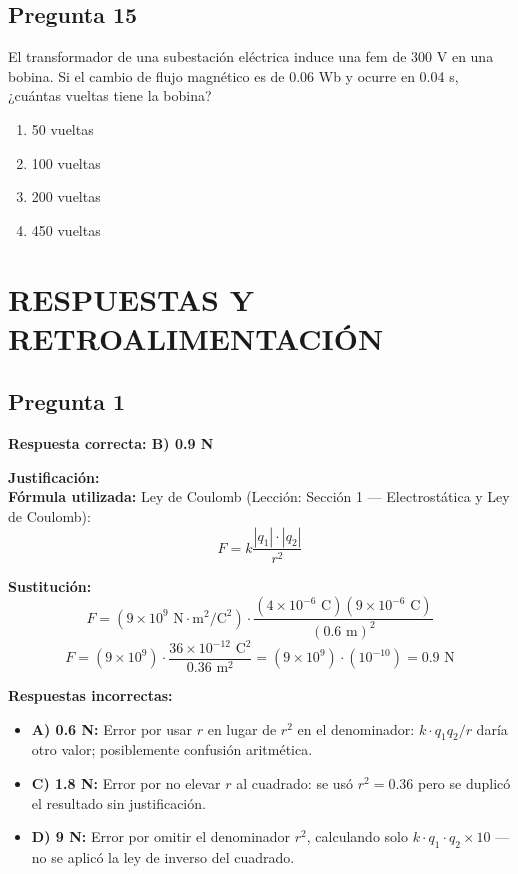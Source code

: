 \begin{preguntabox}
\subsection{Pregunta 15}
El transformador de una subestación eléctrica induce una fem de 300 V en una bobina. Si el cambio de flujo magnético es de 0.06 Wb y ocurre en 0.04 s, ¿cuántas vueltas tiene la bobina?

\begin{enumerate}
    \item[A)] 50 vueltas
    \item[B)] 100 vueltas
    \item[C)] 200 vueltas
    \item[D)] 450 vueltas
\end{enumerate}
\end{preguntabox}

\newpage
\onecolumn
\section{RESPUESTAS Y RETROALIMENTACIÓN}

\begin{respuestabox}
\subsection{Pregunta 1}
\textcolor{verdecorrecto}{\textbf{Respuesta correcta: B) 0.9 N}}

\textbf{Justificación:}\\
\textbf{Fórmula utilizada:} Ley de Coulomb (Lección: Sección 1 — Electrostática y Ley de Coulomb):
$$F = k \frac{|q_1| \cdot |q_2|}{r^2}$$

\textbf{Sustitución:}
$$F = (9 \times 10^9 \text{ N}\cdot\text{m}^2/\text{C}^2) \cdot \frac{(4 \times 10^{-6} \text{ C})(9 \times 10^{-6} \text{ C})}{(0.6 \text{ m})^2}$$
$$F = (9 \times 10^9) \cdot \frac{36 \times 10^{-12} \text{ C}^2}{0.36 \text{ m}^2} = (9 \times 10^9) \cdot (10^{-10}) = 0.9 \text{ N}$$

\textbf{Respuestas incorrectas:}
\begin{itemize}
    \item \textbf{A) 0.6 N:} Error por usar $r$ en lugar de $r^2$ en el denominador: $k \cdot q_1 q_2 / r$ daría otro valor; posiblemente confusión aritmética.
    \item \textbf{C) 1.8 N:} Error por no elevar $r$ al cuadrado: se usó $r^2 = 0.36$ pero se duplicó el resultado sin justificación.
    \item \textbf{D) 9 N:} Error por omitir el denominador $r^2$, calculando solo $k \cdot q_1 \cdot q_2 \times 10$ — no se aplicó la ley de inverso del cuadrado.
\end{itemize}
\end{respuestabox}


